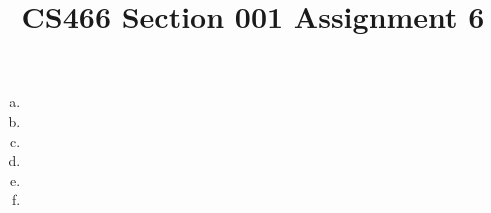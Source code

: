 \documentclass[12pt]{article}
\title{CS466 Section 001 Assignment 6}
\begin{document}
\maketitle

\begin{enumerate}[(a)]
\item
\item
\item
\item
\item
\item
\end{enumerate}
\end{document}
